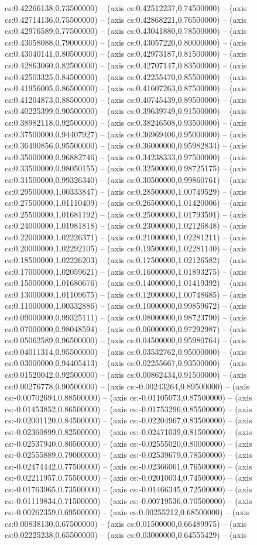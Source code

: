 cs:0.42266138,0.73500000) -- (axis cs:0.42512237,0.74500000) -- (axis cs:0.42714136,0.75500000) -- (axis cs:0.42868221,0.76500000) -- (axis cs:0.42976589,0.77500000) -- (axis cs:0.43041880,0.78500000) -- (axis cs:0.43058088,0.79000000) -- (axis cs:0.43057220,0.80000000) -- (axis cs:0.43040141,0.80500000) -- (axis cs:0.42973187,0.81500000) -- (axis cs:0.42863060,0.82500000) -- (axis cs:0.42707147,0.83500000) -- (axis cs:0.42503325,0.84500000) -- (axis cs:0.42255470,0.85500000) -- (axis cs:0.41956005,0.86500000) -- (axis cs:0.41607263,0.87500000) -- (axis cs:0.41204873,0.88500000) -- (axis cs:0.40745439,0.89500000) -- (axis cs:0.40225399,0.90500000) -- (axis cs:0.39639749,0.91500000) -- (axis cs:0.38982118,0.92500000) -- (axis cs:0.38246508,0.93500000) -- (axis cs:0.37500000,0.94407927) -- (axis cs:0.36969406,0.95000000) -- (axis cs:0.36490856,0.95500000) -- (axis cs:0.36000000,0.95982834) -- (axis cs:0.35000000,0.96882746) -- (axis cs:0.34238333,0.97500000) -- (axis cs:0.33500000,0.98050155) -- (axis cs:0.32500000,0.98725175) -- (axis cs:0.31500000,0.99326340) -- (axis cs:0.30500000,0.99860761) -- (axis cs:0.29500000,1.00333847) -- (axis cs:0.28500000,1.00749529) -- (axis cs:0.27500000,1.01110409) -- (axis cs:0.26500000,1.01420006) -- (axis cs:0.25500000,1.01681192) -- (axis cs:0.25000000,1.01793591) -- (axis cs:0.24000000,1.01981818) -- (axis cs:0.23000000,1.02126848) -- (axis cs:0.22000000,1.02226371) -- (axis cs:0.21000000,1.02281211) -- (axis cs:0.20000000,1.02292105) -- (axis cs:0.19500000,1.02281140) -- (axis cs:0.18500000,1.02226203) -- (axis cs:0.17500000,1.02126582) -- (axis cs:0.17000000,1.02059621) -- (axis cs:0.16000000,1.01893275) -- (axis cs:0.15000000,1.01680676) -- (axis cs:0.14000000,1.01419392) -- (axis cs:0.13000000,1.01109675) -- (axis cs:0.12000000,1.00748685) -- (axis cs:0.11000000,1.00332886) -- (axis cs:0.10000000,0.99859672) -- (axis cs:0.09000000,0.99325111) -- (axis cs:0.08000000,0.98723790) -- (axis cs:0.07000000,0.98048594) -- (axis cs:0.06000000,0.97292987) -- (axis cs:0.05062589,0.96500000) -- (axis cs:0.04500000,0.95980764) -- (axis cs:0.04011314,0.95500000) -- (axis cs:0.03532762,0.95000000) -- (axis cs:0.03000000,0.94405413) -- (axis cs:0.02255667,0.93500000) -- (axis cs:0.01520042,0.92500000) -- (axis cs:0.00862434,0.91500000) -- (axis cs:0.00276778,0.90500000) -- (axis cs:-0.00243264,0.89500000) -- (axis cs:-0.00702694,0.88500000) -- (axis cs:-0.01105073,0.87500000) -- (axis cs:-0.01453852,0.86500000) -- (axis cs:-0.01753296,0.85500000) -- (axis cs:-0.02001120,0.84500000) -- (axis cs:-0.02204967,0.83500000) -- (axis cs:-0.02360899,0.82500000) -- (axis cs:-0.02471039,0.81500000) -- (axis cs:-0.02537940,0.80500000) -- (axis cs:-0.02555020,0.80000000) -- (axis cs:-0.02555889,0.79000000) -- (axis cs:-0.02539679,0.78500000) -- (axis cs:-0.02474442,0.77500000) -- (axis cs:-0.02366061,0.76500000) -- (axis cs:-0.02211957,0.75500000) -- (axis cs:-0.02010034,0.74500000) -- (axis cs:-0.01763965,0.73500000) -- (axis cs:-0.01466345,0.72500000) -- (axis cs:-0.01119834,0.71500000) -- (axis cs:-0.00719536,0.70500000) -- (axis cs:-0.00262359,0.69500000) -- (axis cs:0.00255212,0.68500000) -- (axis cs:0.00838130,0.67500000) -- (axis cs:0.01500000,0.66489975) -- (axis cs:0.02225238,0.65500000) -- (axis cs:0.03000000,0.64555429) -- (axis 
